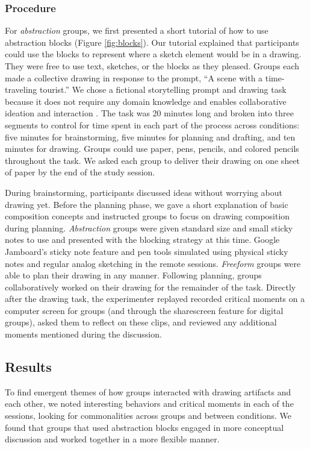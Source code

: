 \subsubsection{Procedure}
For \textit{abstraction} groups, we first presented a short tutorial of how to use abstraction blocks (Figure \ref{fig:blocks}). Our tutorial explained that participants could use the blocks to represent where a sketch element would be in a drawing. They were free to use text, sketches, or the blocks as they pleased. Groups each made a collective drawing in response to the prompt, ``A scene with a time-traveling tourist.'' We chose a fictional storytelling prompt and drawing task because it does not require any domain knowledge and enables collaborative ideation and interaction \cite{Davis2017}. The task was 20 minutes long and broken into three segments to control for time spent in each part of the process across conditions: five minutes for brainstorming, five minutes for planning and drafting, and ten minutes for drawing. Groups could use paper, pens, pencils, and colored pencils throughout the task. We asked each group to deliver their drawing on one sheet of paper by the end of the study session.

During brainstorming, participants discussed ideas without worrying about drawing yet. Before the planning phase, we gave a short explanation of basic composition concepts and instructed groups to focus on drawing composition during planning. \textit{Abstraction} groups were given standard size and small sticky notes to use and presented with the blocking strategy at this time. Google Jamboard's sticky note feature and pen tools simulated using physical sticky notes and regular analog sketching in the remote sessions. \textit{Freeform} groups were able to plan their drawing in any manner. Following planning, groups collaboratively worked on their drawing for the remainder of the task. Directly after the drawing task, the experimenter replayed recorded critical moments on a computer screen for groups (and through the sharescreen feature for digital groups), asked them to reflect on these clips, and reviewed any additional moments mentioned during the discussion. 

\subsection{Results}
To find emergent themes of how groups interacted with drawing artifacts and each other, we noted interesting behaviors and critical moments in each of the sessions, looking for commonalities across groups and between conditions. We found that groups that used abstraction blocks engaged in more conceptual discussion and worked together in a more flexible manner.

